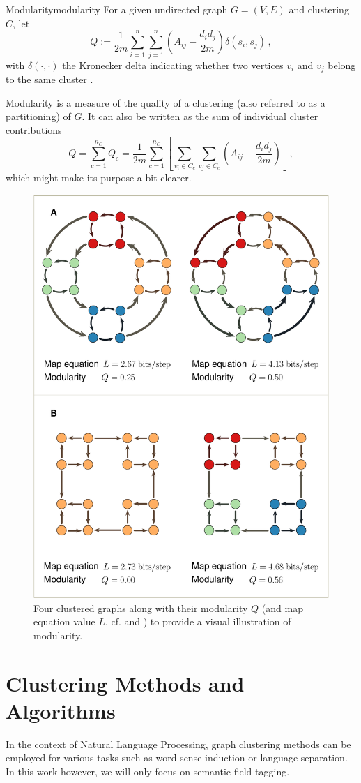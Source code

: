 \documentclass[12pt, a4paper]{article}
\begin{document}
  \begin{definition}{Modularity}{modularity}
    For a given undirected graph $G = (V, E)$ and clustering $C$, let $$Q := \frac{1}{2m} \sum_{i=1}^{n} \sum_{j=1}^{n} \left(A_{ij} - \frac{d_i d_j}{2m}\right) \delta(s_i, s_j)\,,$$ with $\delta(\cdot, \cdot)$ the Kronecker delta indicating whether two vertices $v_i$ and $v_j$ belong to the same cluster \parencite{lambiotte-louvain-clustering}.
  \end{definition}

  Modularity is a measure of the quality of a clustering (also referred to as a partitioning) of $G$. It can also be written as the sum of individual cluster contributions
  $$Q = \sum_{c=1}^{n_C} Q_c = \frac{1}{2m} \sum_{c=1}^{n_C} \left[\sum_{v_i \in C_c} \sum_{v_j \in C_c} \left(A_{ij} - \frac{d_i d_j}{2m}\right)\right]\,,$$
  which might make its purpose a bit clearer.

  \begin{figure}[H]
    \centering
    \includegraphics[width=0.56\linewidth]{figures/nice-modularity.eps}
    \caption{Four clustered graphs along with their modularity $Q$ (and map equation value $L$, cf. \cite{mapequation} and ) to provide a visual illustration of modularity.}
  \end{figure}

  \section{Clustering Methods and Algorithms}
  In the context of Natural Language Processing, graph clustering methods can be employed for various tasks such as word sense induction or language separation.
  In this work however, we will only focus on semantic field tagging.
\end{document}
